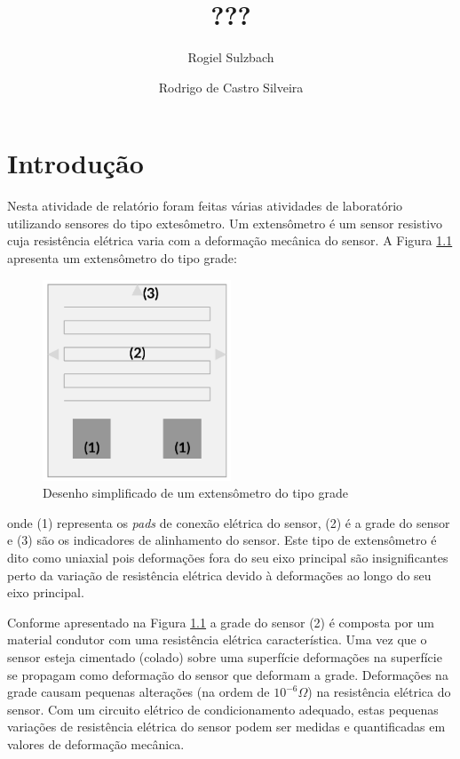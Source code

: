 \documentclass[a4paper]{instrumentacao}
\title{???}
\author{Rogiel Sulzbach \and Rodrigo de Castro Silveira}
\institute{}
\begin{document}
\maketitle

\chapter{Introdução}

Nesta atividade de relatório foram feitas várias atividades de laboratório utilizando sensores do tipo extesômetro. Um extensômetro é um sensor resistivo cuja resistência elétrica varia com a deformação mecânica do sensor. A Figura \ref{fig:intro-extensometro} apresenta um extensômetro do tipo grade:

\begin{figure}[H]
\center
\includegraphics[width=0.5\textwidth]{ExtensometroGrade.pdf}
\caption{Desenho simplificado de um extensômetro do tipo grade}
\label{fig:intro-extensometro}
\end{figure}

\noindent onde (1) representa os \textit{pads} de conexão elétrica do sensor, (2) é a grade do sensor e (3) são os indicadores de alinhamento do sensor. Este tipo de extensômetro é dito como uniaxial pois deformações fora do seu eixo principal são insignificantes perto da variação de resistência elétrica devido à deformações ao longo do seu eixo principal.

Conforme apresentado na Figura \ref{fig:intro-extensometro} a grade do sensor (2) é composta por um material condutor com uma resistência elétrica característica. Uma vez que o sensor esteja cimentado (colado) sobre uma superfície deformações na superfície se propagam como deformação do sensor que deformam a grade. Deformações na grade causam pequenas alterações (na ordem de $10^{-6} \Omega$) na resistência elétrica do sensor. Com um circuito elétrico de condicionamento adequado, estas pequenas variações de resistência elétrica do sensor podem ser medidas e quantificadas em valores de deformação mecânica.
\end{document}
